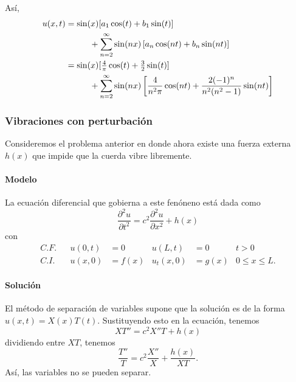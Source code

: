 \documentclass[11pt,letterpaper,draft]{report}
\newcommand\<{\langle}
\renewcommand\>{\rangle}
\begin{document}
Así,
\begin{align*}
  u(x,t)
  &= \sin(x)[a_1\cos(t)+b_1\sin(t)]
  \\ &\hspace{10mm}
  + \sum_{n=2}^{\infty}\sin(nx)
    \left[
      a_n\cos(nt)+b_n\sin(nt)
    \right] \\
  &= \sin(x)[\tfrac{4}{\pi}\cos(t)+\tfrac{3}{2}\sin(t)]
  \\ &\hspace{10mm}
  + \sum_{n=2}^{\infty}\sin(nx)
    \left[
      \frac{4}{n^2\pi}\cos(nt)+\frac{2(-1)^n}{n^2(n^2-1)}\sin(nt)
    \right] \\
\end{align*}

\subsubsection{Vibraciones con perturbación}
Consideremos el problema anterior en donde ahora existe una fuerza
externa $h(x)$ que impide que la cuerda vibre libremente.

\paragraph{Modelo}
La ecuación diferencial que gobierna a este fenóneno está dada como
\[
  \frac{\partial ^2u}{\partial t^2}
  = c^2 \frac{\partial ^2u}{\partial x^2} + h(x)
\]
con
\begin{align*}
  C.F.&& u(0,t)&=0 & u(L,t)&=0 & t>0 \\
  C.I.&& u(x,0)&=f(x) & u_t(x,0)&=g(x) & 0\leq x\leq L.
\end{align*}

\paragraph{Solución}
El método de separación de variables supone que la solución es de la
forma $u(x,t)=X(x)T(t)$. Sustituyendo esto en la ecuación, tenemos
\[
  XT''=c^2X''T+h(x)
\]
dividiendo entre $XT$, tenemos
\[
  \frac{T''}{T} = c^2 \frac{X''}{X} + \frac{h(x)}{XT}
.\]
Así, las variables no se pueden separar.
\end{document}
